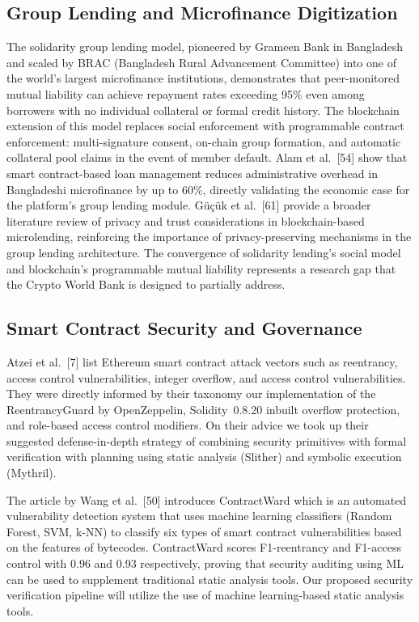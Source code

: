 \documentclass[12pt,a4paper]{report}
\begin{document}
\subsection{Group Lending and Microfinance Digitization}

The solidarity group lending model, pioneered by Grameen Bank in Bangladesh and scaled by BRAC (Bangladesh Rural Advancement Committee) into one of the world's largest microfinance institutions, demonstrates that peer-monitored mutual liability can achieve repayment rates exceeding 95\% even among borrowers with no individual collateral or formal credit history. The blockchain extension of this model replaces social enforcement with programmable contract enforcement: multi-signature consent, on-chain group formation, and automatic collateral pool claims in the event of member default. Alam et al.~[54] show that smart contract-based loan management reduces administrative overhead in Bangladeshi microfinance by up to 60\%, directly validating the economic case for the platform's group lending module. Güçük et al.~[61] provide a broader literature review of privacy and trust considerations in blockchain-based microlending, reinforcing the importance of privacy-preserving mechanisms in the group lending architecture. The convergence of solidarity lending's social model and blockchain's programmable mutual liability represents a research gap that the Crypto World Bank is designed to partially address.

\subsection{Smart Contract Security and Governance}

Atzei et al.~[7] list Ethereum smart contract attack vectors such as reentrancy, access control vulnerabilities, integer overflow, and access control vulnerabilities. They were directly informed by their taxonomy our implementation of the ReentrancyGuard by OpenZeppelin, Solidity~0.8.20 inbuilt overflow protection, and role-based access control modifiers. On their advice we took up their suggested defense-in-depth strategy of combining security primitives with formal verification with planning using static analysis (Slither) and symbolic execution (Mythril).

The article by Wang et al.~[50] introduces ContractWard which is an automated vulnerability detection system that uses machine learning classifiers (Random Forest, SVM, k-NN) to classify six types of smart contract vulnerabilities based on the features of bytecodes. ContractWard scores F1-reentrancy and F1-access control with 0.96 and 0.93 respectively, proving that security auditing using ML can be used to supplement traditional static analysis tools. Our proposed security verification pipeline will utilize the use of machine learning-based static analysis tools.
\end{document}
